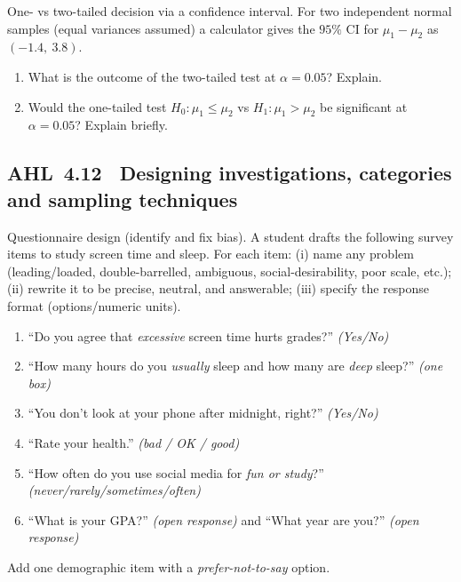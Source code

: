 \documentclass[11pt]{article}
\def\textbf#1{#1}%
\newcommand{\tocsubsection}[1]{\subsection{#1}}
\newcounter{question}
\begin{document}
\begin{question}
\textbf{One- vs two-tailed decision via a confidence interval.}
For two independent normal samples (equal variances assumed) a calculator gives the $95\%$ CI for $\mu_1-\mu_2$ as
$(-1.4,\ 3.8)$.
\begin{enumerate}
  \item What is the outcome of the two-tailed test at $\alpha=0.05$? Explain.
  \item Would the one-tailed test $H_0:\mu_1\le\mu_2$ vs $H_1:\mu_1>\mu_2$ be significant at $\alpha=0.05$? Explain briefly.
\end{enumerate}
\end{question}
\tocsubsection{AHL 4.12 \; Designing investigations, categories and sampling techniques}


\begin{question}
\textbf{Questionnaire design (identify and fix bias).}
A student drafts the following survey items to study screen time and sleep. For each item:
(i) name any problem (leading/loaded, double-barrelled, ambiguous, social-desirability, poor scale, etc.);
(ii) rewrite it to be precise, neutral, and answerable; (iii) specify the response format (options/numeric units).
\begin{enumerate}
  \item “Do you agree that \emph{excessive} screen time hurts grades?” \emph{(Yes/No)}
  \item “How many hours do you \emph{usually} sleep and how many are \emph{deep} sleep?” \emph{(one box)}
  \item “You don’t look at your phone after midnight, right?” \emph{(Yes/No)}
  \item “Rate your health.” \emph{(bad / OK / good)}
  \item “How often do you use social media for \emph{fun or study}?” \emph{(never/rarely/sometimes/often)}
  \item “What is your GPA?” \emph{(open response)} and “What year are you?” \emph{(open response)}
\end{enumerate}
Add one demographic item with a \emph{prefer-not-to-say} option.
\end{question}
\end{document}
